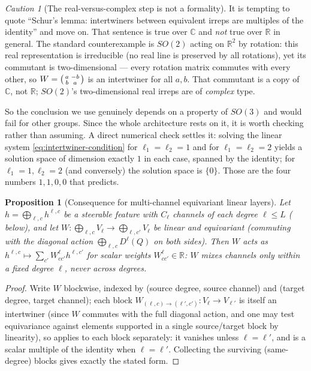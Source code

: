 \documentclass[11pt,a4paper]{report}
\newtheorem{proposition}[proposition]{Proposition}
\theoremstyle{definition}
\theoremstyle{remark}
\newtheorem{caution}[caution]{Caution}
\newcommand{\RR}{\mathbb R}
\newcommand{\CC}{\mathbb C}
\begin{document}
\begin{caution}[The real-versus-complex step is not a formality]
\label{caution:schur-real-type}
It is tempting to quote ``Schur's lemma: intertwiners between equivalent
irreps are multiples of the identity'' and move on. That sentence is true
over $\CC$ and \emph{not} true over $\RR$ in general. The standard
counterexample is $SO(2)$ acting on $\RR^2$ by rotation: this real
representation is irreducible (no real line is preserved by all rotations),
yet its commutant is two-dimensional --- every rotation matrix commutes with
every other, so
$W=\begin{psmallmatrix}a&-b\\ b&a\end{psmallmatrix}$ is an intertwiner for
all $a,b$. That commutant is a copy of $\CC$, not $\RR$; $SO(2)$'s
two-dimensional real irreps are of \emph{complex} type.

So the conclusion we use genuinely depends on a property of $SO(3)$ and
would fail for other groups. Since the whole architecture rests on it, it is
worth checking rather than assuming. A direct numerical check settles it:
solving the linear system \eqref{eq:intertwiner-condition} for
$\ell_1=\ell_2=1$ and for $\ell_1=\ell_2=2$ yields a solution space of
dimension exactly $1$ in each case, spanned by the identity; for
$\ell_1=1,\ell_2=2$ (and conversely) the solution space is $\{0\}$. Those
are the four numbers $1,1,0,0$ that  predicts.
\end{caution}

\begin{proposition}[Consequence for multi-channel equivariant linear layers]
\label{prop:multichannel-linear}
Let $h=\bigoplus_{\ell,c}h^{\ell,c}$ be a steerable feature with $C_\ell$
channels of each degree $\ell\le L$ ( below),
and let $W:\bigoplus_{\ell,c}V_\ell\to\bigoplus_{\ell,c'}V_\ell$ be linear
and equivariant (commuting with the diagonal action
$\bigoplus_{\ell,c}D^\ell(Q)$ on both sides). Then $W$ acts as
$h^{\ell,c}\mapsto\sum_{c'}W^\ell_{cc'}h^{\ell,c'}$ for scalar weights
$W^\ell_{cc'}\in\RR$: $W$ mixes channels only \emph{within} a fixed degree
$\ell$, never across degrees.
\end{proposition}

\begin{proof}
Write $W$ blockwise, indexed by (source degree, source channel) and
(target degree, target channel); each block
$W_{(\ell,c)\to(\ell',c')}:V_\ell\to V_{\ell'}$ is itself an intertwiner
(since $W$ commutes with the full diagonal action, and one may test
equivariance against elements supported in a single source/target block by
linearity), so  applies to each block separately:
it vanishes unless $\ell=\ell'$, and is a scalar multiple of the identity
when $\ell=\ell'$. Collecting the surviving (same-degree) blocks gives
exactly the stated form.
\end{proof}
\end{document}
